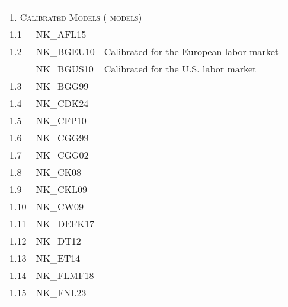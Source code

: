\documentclass[11pt,a4paper]{article}
\begin{document}
	\begin{table}[H]
		\vspace{-1.0cm}
		\label{tab:modov}
		\begin{tabularx}{\textwidth}{lll}
			\hline \hline
			&& \\
			\multicolumn{3}{l}{\textsc{1. Calibrated Models (\the\value{NKnumber} models)}} \\
			
			1.1	&	NK\_AFL15\footnotemark[2]	&	\cite{Angelonietal2015}	\\								
			1.2	&	NK\_BGEU10	&	\cite{BlanchardGali10}	Calibrated	for	the	European	labor	market	\\		
			&	NK\_BGUS10	&	\cite{BlanchardGali10}	Calibrated	for	the	U.S.	labor	market\\	
			1.3	&	NK\_BGG99	&	\cite{BernankeGertlerGilchrist1999}	\\
			1.4 & NK\_CDK24 & \cite{chan2024energy}  \\								
			1.5	&	NK\_CFP10	&	\cite{carlstrom2010optimal}	\\								
			1.6\footnotemark[1]	&	NK\_CGG99	&	\cite{ClaridaGaliGertler1999}\\%
			1.7\footnotemark[1]	&	NK\_CGG02	&	\cite{ClaridaGaliGertler2002}\\%
			1.8\footnotemark[1]	&	NK\_CK08	&	\cite{ChristoffelKuester2008}\\%
			1.9\footnotemark[1]	&	NK\_CKL09	&	\cite{ChristoffelKuesterLinzert2009}\\%
			1.10	&	NK\_CW09	&	\cite{CurdiaWoodford2009}	\\	
			1.11	&	NK\_DEFK17	&	\cite{delnegro2017eggertson}	\\								
			1.12	&	NK\_DT12		&	\cite{defiore2012tristani}	\\								
			1.13	&	NK\_ET14		&	\cite{EllisonTischbirek2014}	\\								
			1.14	&	NK\_FLMF18	&	\cite{filardo2018monetary}	\\
			1.15& NK\_FNL23 & \cite{ferraria2023toward} \\								

\end{tabularx}
\end{table}
\end{document}
